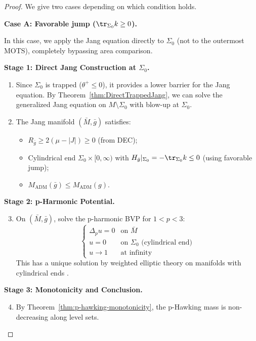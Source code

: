 \begin{proof}
We give two cases depending on which condition holds.

\textbf{Case A: Favorable jump ($\tr_{\Sigma_0} k \geq 0$).}

In this case, we apply the Jang equation directly to $\Sigma_0$ (not to the outermost MOTS), completely bypassing area comparison.

\textbf{Stage 1: Direct Jang Construction at $\Sigma_0$.}
\begin{enumerate}
\item Since $\Sigma_0$ is trapped ($\theta^+ \leq 0$), it provides a lower barrier for the Jang equation. By Theorem~\ref{thm:DirectTrappedJang}, we can solve the generalized Jang equation on $M \setminus \Sigma_0$ with blow-up at $\Sigma_0$.
\item The Jang manifold $(\bar{M}, \bar{g})$ satisfies:
\begin{itemize}
\item $R_{\bar{g}} \geq 2(\mu - |J|) \geq 0$ (from DEC);
\item Cylindrical end $\Sigma_0 \times [0, \infty)$ with $H_{\bar{g}}|_{\Sigma_0} = -\tr_{\Sigma_0} k \leq 0$ (using favorable jump);
\item $M_{\mathrm{ADM}}(\bar{g}) \leq M_{\mathrm{ADM}}(g)$.
\end{itemize}
\end{enumerate}

\textbf{Stage 2: p-Harmonic Potential.}
\begin{enumerate}
\setcounter{enumi}{2}
\item On $(\bar{M}, \bar{g})$, solve the p-harmonic BVP for $1 < p < 3$:
\begin{equation}
\begin{cases}
\Delta_p u = 0 & \text{on } \bar{M} \\
u = 0 & \text{on } \Sigma_0 \text{ (cylindrical end)} \\
u \to 1 & \text{at infinity}
\end{cases}
\end{equation}
This has a unique solution by weighted elliptic theory on manifolds with cylindrical ends \cite{mazya2011,lindqvist2017}.
\end{enumerate}

\textbf{Stage 3: Monotonicity and Conclusion.}
\begin{enumerate}
\setcounter{enumi}{3}
\item By Theorem~\ref{thm:p-hawking-monotonicity}, the p-Hawking mass is non-decreasing along level sets.


\end{enumerate}
\end{proof}
